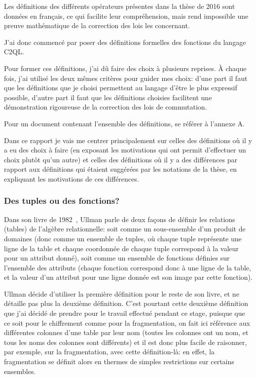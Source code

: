 Les définitions des différents opérateurs présentes dans la thèse de 2016
sont données en français, ce qui facilite leur compréhension, mais rend
impossible une preuve mathématique de la correction des lois les concernant.

J'ai donc commencé par poser des définitions formelles des fonctions du langage
C2QL.

Pour former ces définitions, j'ai dû faire des choix à plusieurs reprises.
À chaque fois, j'ai utilisé les deux mêmes critères pour guider mes choix:
d'une part il faut que les définitions que je choisi permettent au langage
d'être le plus expressif possible, d'autre part il faut que les définitions
choisies facilitent une démonstration rigoureuse de la correction
des lois de commutation.

Pour un document contenant l'ensemble des définitions,
se référer à l'annexe A.

Dans ce rapport je vais me centrer principalement
sur celles des définitions où il y a eu des choix à faire
(en exposant les motivations qui ont permit d'effectuer un choix
plutôt qu'un autre) et celles des définitions où il y a des différences par rapport
aux définitions qui étaient suggérées par les notations de la thèse,
en expliquant les motivations de ces différences.

\subsubsection*{Des tuples ou des fonctions?}
Dans son livre de 1982~\cite{ullman}, Ullman parle de deux
façons de définir les relations (tables) de l'algèbre relationnelle:
soit comme un sous-ensemble d'un produit de domaines
(donc comme un ensemble de tuples, où chaque
tuple représente une ligne
de la table et chaque coordonnée de chaque tuple correspond
à la valeur pour un attribut donné), soit comme un ensemble de fonctions
définies sur l'ensemble des attributs (chaque fonction correspond donc
à une ligne de la table, et la valeur d'un attribut pour une ligne donnée
est son image par cette fonction).

Ullman décide d'utiliser la première définition pour le reste de son livre,
et ne détaille pas plus la deuxième définition. C'est pourtant cette deuxième
définition que j'ai décidé de prendre pour
le travail effectué pendant ce stage, puisque que ce soit
pour le chiffrement comme pour la fragmentation, on fait ici référence aux différentes
colonnes d'une table par leur nom (toutes les colonnes ont un nom, et tous les
noms des colonnes sont différents) et il est donc plus facile de raisonner,
par exemple, sur la fragmentation, avec cette définition-là:
en effet, la fragmentation se définit alors en thermes de simples restrictions
sur certains ensembles.

